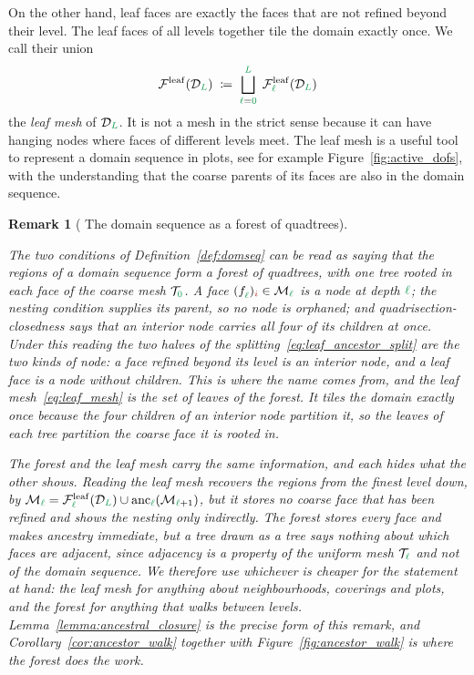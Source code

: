 \documentclass[a4paper, 12pt]{article}
\makeatletter
\newcommand{\robert}[1]{{\color{orange} #1}}
\newcommand{\guidance}[1]{{\color{lime!70!black} #1}}
\newcommand{\green}{\color{ForestGreen}}
\newcommand{\brickred}{\color{BrickRed}}
\newcommand{\T}{\mathcal{T}}
\newcommand{\F}{\mathcal{F}}
\newcommand{\face}[2]{\freeQ{f}{}{#1}{#2}}
\newcommand{\coarseIdxone}{{\brickred i}}
\renewcommand{\l}{{\green\ell}}
\renewcommand{\L}{{\green L}}
\newcommand{\lzero}{{\green 0}}
\newcommand{\freeQ}[4]{ ( {#1}^{#2}_{#3} )_{#4}}
\newcommand{\M}{\mathcal{M}}
\newtheorem{remark}[theorem]{Remark}
\theoremstyle{definition}
\theoremstyle{plain}
\numberwithin{equation}{section}
\DeclareRobustCommand{\domseq}[1][]{\mathcal{D}\ifx\@empty#1\@empty\else_{#1}\fi}
\newcommand{\leafF}[1]{\F^{\mathrm{leaf}}_{#1}}             %
\newcommand{\leafMesh}{\F^{\mathrm{leaf}}}                  %
\newcommand{\anc}[1]{\mathrm{anc}_{#1}}                     %
\makeatother
\begin{document}
On the other hand, leaf faces are exactly the faces that are not refined beyond their level. The leaf faces of all levels together tile the domain exactly once. We call their union
\begin{equation}
    \label{eq:leaf_mesh}
    \leafMesh(\domseq[\L]) \; \coloneq \; \bigsqcup\limits_{\l = \lzero}^{\L} \; \leafF{\l}(\domseq[\L])
\end{equation}
the \emph{leaf mesh} of $\domseq[\L]$. It is not a mesh in the strict sense because it can \guidance{have hanging nodes where faces of different levels meet}. The leaf mesh is a useful tool to represent a domain sequence in plots, see for example Figure~\ref{fig:active_dofs}, with the understanding that the coarse parents of its faces are also in the domain sequence. 

\begin{remark}[\robert{The domain sequence as a forest of quadtrees}]
    \label{rem:tree_reading}
    \robert{The two conditions of Definition~\ref{def:domseq} can be read as saying that the regions of a domain sequence form a forest of quadtrees, with one tree rooted in each face of the coarse mesh $\T_\lzero$. A face $\face{\l}{\coarseIdxone} \in \M_\l$ is a node at depth $\l$; the nesting condition supplies its parent, so no node is orphaned; and quadrisection-closedness says that an interior node carries all four of its children at once. Under this reading the two halves of the splitting~\eqref{eq:leaf_ancestor_split} are the two kinds of node: a face refined beyond its level is an interior node, and a leaf face is a node without children. This is where the name comes from, and the leaf mesh~\eqref{eq:leaf_mesh} is the set of leaves of the forest. It tiles the domain exactly once because the four children of an interior node partition it, so the leaves of each tree partition the coarse face it is rooted in.

    The forest and the leaf mesh carry the same information, and each hides what the other shows. Reading the leaf mesh recovers the regions from the finest level down, by $\M_\l = \leafF{\l}(\domseq[\L]) \cup \anc{\l}(\M_{\l+1})$, but it stores no coarse face that has been refined and shows the nesting only indirectly. The forest stores every face and makes ancestry immediate, but a tree drawn as a tree says nothing about which faces are adjacent, since adjacency is a property of the uniform mesh $\T_\l$ and not of the domain sequence. We therefore use whichever is cheaper for the statement at hand: the leaf mesh for anything about neighbourhoods, coverings and plots, and the forest for anything that walks between levels. Lemma~\ref{lemma:ancestral_closure} is the precise form of this remark, and Corollary~\ref{cor:ancestor_walk} together with Figure~\ref{fig:ancestor_walk} is where the forest does the work.}
\end{remark}
\end{document}

